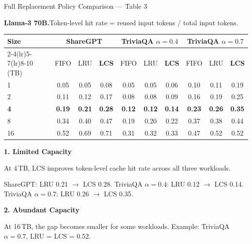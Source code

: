 \documentclass[aspectratio=169,10pt]{beamer}
\begin{document}
\begin{frame}[t,label=B26]{Full Replacement Policy Comparison --- Table 3}
\vspace{0.01cm}
{\footnotesize\textbf{Llama-3 70B.}\quad Token-level hit rate = reused input tokens / total input tokens.\par}
\vspace{0.05cm}
{\centering\footnotesize\setlength{\tabcolsep}{3.6pt}\renewcommand{\arraystretch}{1.08}
\begin{tabular}{@{}lccccccccc@{}}
\toprule
Size & \multicolumn{3}{c}{\textbf{ShareGPT}} & \multicolumn{3}{c}{\textbf{TriviaQA $\alpha=0.4$}} & \multicolumn{3}{c}{\textbf{TriviaQA $\alpha=0.7$}}\\
\cmidrule(lr){2-4}\cmidrule(lr){5-7}\cmidrule(lr){8-10}
(TB) & FIFO & LRU & \textcolor{Accent}{\textbf{LCS}} & FIFO & LRU & \textcolor{Accent}{\textbf{LCS}} & FIFO & LRU & \textcolor{Accent}{\textbf{LCS}}\\
\midrule
1 & 0.05 & 0.05 & 0.08 & 0.05 & 0.05 & 0.06 & 0.10 & 0.11 & 0.19\\
2 & 0.11 & 0.12 & 0.17 & 0.08 & 0.08 & 0.09 & 0.16 & 0.19 & 0.25\\
\textbf{4} & \textbf{0.19} & \textbf{0.21} & \textbf{0.28} & \textbf{0.12} & \textbf{0.12} & \textbf{0.14} & \textbf{0.23} & \textbf{0.26} & \textbf{0.35}\\
8 & 0.34 & 0.40 & 0.47 & 0.19 & 0.20 & 0.22 & 0.37 & 0.38 & 0.44\\
16 & 0.52 & 0.69 & 0.71 & 0.31 & 0.32 & 0.33 & 0.47 & 0.52 & 0.52\\
\bottomrule
\end{tabular}\par}
\vspace{0.03cm}
{\footnotesize\textbf{\textcolor{Accent}{1. Limited Capacity}}\par}
{\scriptsize At 4\,TB, LCS improves token-level cache hit rate across all three workloads.\par}
{\scriptsize ShareGPT: LRU 0.21 $\rightarrow$ LCS 0.28.\quad
TriviaQA $\alpha=0.4$: LRU 0.12 $\rightarrow$ LCS 0.14.\quad
TriviaQA $\alpha=0.7$: LRU 0.26 $\rightarrow$ LCS 0.35.\par}
\vspace{0.04cm}
{\footnotesize\textbf{\textcolor{Accent}{2. Abundant Capacity}}\par}
{\scriptsize At 16\,TB, the gap becomes smaller for some workloads.
Example: TriviaQA $\alpha=0.7$, LRU = LCS = 0.52.\par}
\vspace{0.04cm}

\end{frame}
\end{document}
